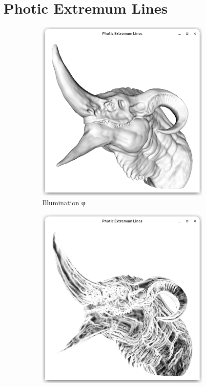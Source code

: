 \documentclass[9pt,fleqn,twoside,twocolumn]{stdglobal}
\begin{document}
\section{Photic Extremum Lines}

  \begin{figure}[h]
    \centering
    \begin{subfigure}[b]{0.24\textwidth}
      \centering
      \includegraphics[width=0.95\textwidth,trim={15px 15 15 50},clip]{images/dragon-head-vertex-lighting.png}
      \caption{Illumination φ}
    \end{subfigure}%
    \hfill%
    \begin{subfigure}[b]{0.24\textwidth}
      \centering
      \includegraphics[width=0.95\textwidth,trim={15px 15 15 50},clip]{images/dragon-head-light-variation.png}

\end{subfigure}
\end{figure}
\end{document}
